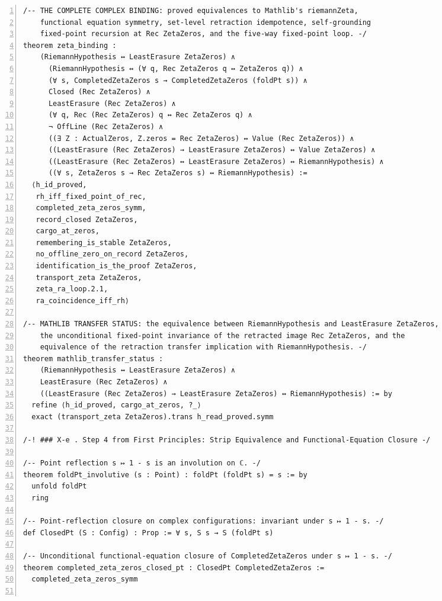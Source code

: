 \documentclass[10pt]{article}
\newcommand{\leansize}{\fontsize{5.5pt}{6.75pt}\selectfont}
\begin{document}
\begin{multicols}{2}
\begin{Verbatim}[numbers=left,firstnumber=1,numbersep=3pt,xleftmargin=2.6em,breaklines=true,breakanywhere=true,breakautoindent=false,breakindent=1.4em,breaksymbolleft={},breakanywheresymbolpre={},fontsize=\leansize]
/-- THE COMPLETE COMPLEX BINDING: proved equivalences to Mathlib's riemannZeta,
    functional equation symmetry, set-level retraction idempotence, self-grounding
    fixed-point recursion at Rec ZetaZeros, and the five-way fixed-point loop. -/
theorem zeta_binding :
    (RiemannHypothesis ↔ LeastErasure ZetaZeros) ∧
      (RiemannHypothesis ↔ (∀ q, Rec ZetaZeros q ↔ ZetaZeros q)) ∧
      (∀ s, CompletedZetaZeros s → CompletedZetaZeros (foldPt s)) ∧
      Closed (Rec ZetaZeros) ∧
      LeastErasure (Rec ZetaZeros) ∧
      (∀ q, Rec (Rec ZetaZeros) q ↔ Rec ZetaZeros q) ∧
      ¬ OffLine (Rec ZetaZeros) ∧
      ((∃ Z : ActualZeros, Z.zeros = Rec ZetaZeros) ↔ Value (Rec ZetaZeros)) ∧
      ((LeastErasure (Rec ZetaZeros) → LeastErasure ZetaZeros) ↔ Value ZetaZeros) ∧
      ((LeastErasure (Rec ZetaZeros) ↔ LeastErasure ZetaZeros) ↔ RiemannHypothesis) ∧
      ((∀ s, ZetaZeros s → Rec ZetaZeros s) ↔ RiemannHypothesis) :=
  ⟨h_id_proved,
   rh_iff_fixed_point_of_rec,
   completed_zeta_zeros_symm,
   record_closed ZetaZeros,
   cargo_at_zeros,
   remembering_is_stable ZetaZeros,
   no_offline_zero_on_record ZetaZeros,
   identification_is_the_proof ZetaZeros,
   transport_zeta ZetaZeros,
   zeta_ra_loop.2.1,
   ra_coincidence_iff_rh⟩

/-- MATHLIB TRANSFER STATUS: the equivalence between RiemannHypothesis and LeastErasure ZetaZeros,
    the unconditional fixed-point invariance of the retracted image Rec ZetaZeros, and the
    equivalence of the retraction transfer implication with RiemannHypothesis. -/
theorem mathlib_transfer_status :
    (RiemannHypothesis ↔ LeastErasure ZetaZeros) ∧
    LeastErasure (Rec ZetaZeros) ∧
    ((LeastErasure (Rec ZetaZeros) → LeastErasure ZetaZeros) ↔ RiemannHypothesis) := by
  refine ⟨h_id_proved, cargo_at_zeros, ?_⟩
  exact (transport_zeta ZetaZeros).trans h_read_proved.symm

/-! ### X-e . Step 4 from First Principles: Strip Equivalence and Functional-Equation Closure -/

/-- Point reflection s ↦ 1 - s is an involution on ℂ. -/
theorem foldPt_involutive (s : Point) : foldPt (foldPt s) = s := by
  unfold foldPt
  ring

/-- Point-reflection closure on complex configurations: invariant under s ↦ 1 - s. -/
def ClosedPt (S : Config) : Prop := ∀ s, S s → S (foldPt s)

/-- Unconditional functional-equation closure of CompletedZetaZeros under s ↦ 1 - s. -/
theorem completed_zeta_zeros_closed_pt : ClosedPt CompletedZetaZeros :=
  completed_zeta_zeros_symm


\end{Verbatim}
\end{multicols}
\end{document}
